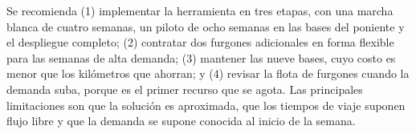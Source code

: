  Se recomienda (1) implementar la herramienta en tres etapas, con una marcha blanca de cuatro semanas, un piloto de ocho semanas en las bases del poniente y el despliegue completo; (2) contratar dos furgones adicionales en forma flexible para las semanas de alta demanda; (3) mantener las nueve bases, cuyo costo es menor que los kilómetros que ahorran; y (4) revisar la flota de furgones cuando la demanda suba, porque es el primer recurso que se agota. Las principales limitaciones son que la solución es aproximada, que los tiempos de viaje suponen flujo libre y que la demanda se supone conocida al inicio de la semana.
